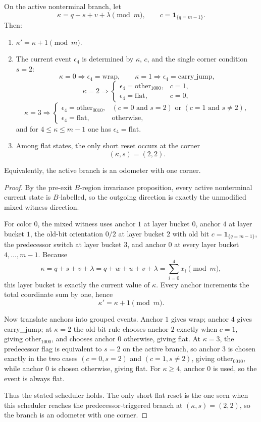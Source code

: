 \begin{theorem}
On the active nonterminal branch, let
\[
\kappa=q+s+v+\lambda \pmod m,
\qquad
c=\mathbf 1_{\{q=m-1\}}.
\]
Then:
\begin{enumerate}
\item $\kappa'=\kappa+1\pmod m$.
\item The current event $\epsilon_4$ is determined by $\kappa$, $c$, and the
single corner condition $s=2$:
\[
\kappa=0\Rightarrow \epsilon_4=\mathrm{wrap},
\qquad
\kappa=1\Rightarrow \epsilon_4=\mathrm{carry\_jump},
\]
\[
\kappa=2\Rightarrow
\begin{cases}
\epsilon_4=\mathrm{other}_{1000},& c=1,\\
\epsilon_4=\mathrm{flat},& c=0,
\end{cases}
\]
\[
\kappa=3\Rightarrow
\begin{cases}
\epsilon_4=\mathrm{other}_{0010},& (c=0 \text{ and } s=2) \text{ or } (c=1 \text{ and } s\neq 2),\\
\epsilon_4=\mathrm{flat},& \text{otherwise},
\end{cases}
\]
and for $4\le \kappa\le m-1$ one has $\epsilon_4=\mathrm{flat}$.
\item Among flat states, the only short reset occurs at the corner
\[
(\kappa,s)=(2,2).
\]
\end{enumerate}
Equivalently, the active branch is an odometer with one corner.
\end{theorem}

\begin{proof}
By the pre-exit $B$-region invariance proposition, every active nonterminal
current state is $B$-labelled, so the outgoing direction is exactly the
unmodified mixed witness direction.

For color $0$, the mixed witness uses anchor $1$ at layer bucket $0$, anchor
$4$ at layer bucket $1$, the old-bit orientation $0/2$ at layer bucket $2$
with old bit $c=\mathbf 1_{\{q=m-1\}}$, the predecessor switch at layer bucket
$3$, and anchor $0$ at every layer bucket $4,\dots,m-1$.
Because
\[
\kappa=q+s+v+\lambda=q+w+u+v+\lambda=\sum_{i=0}^4 x_i \pmod m,
\]
this layer bucket is exactly the current value of $\kappa$. Every anchor
increments the total coordinate sum by one, hence
\[
\kappa'=\kappa+1\pmod m.
\]

Now translate anchors into grouped events. Anchor $1$ gives wrap; anchor $4$
gives carry\_jump; at $\kappa=2$ the old-bit rule chooses anchor $2$ exactly
when $c=1$, giving $\mathrm{other}_{1000}$, and chooses anchor $0$ otherwise,
giving flat. At $\kappa=3$, the predecessor flag is equivalent to $s=2$ on the
active branch, so anchor $3$ is chosen exactly in the two cases
$(c=0,s=2)$ and $(c=1,s\neq 2)$, giving $\mathrm{other}_{0010}$, while anchor
$0$ is chosen otherwise, giving flat. For $\kappa\ge 4$, anchor $0$ is used, so
the event is always flat.

Thus the stated scheduler holds. The only short flat reset is the one seen when
this scheduler reaches the predecessor-triggered branch at $(\kappa,s)=(2,2)$,
so the branch is an odometer with one corner.\qedhere
\end{proof}


